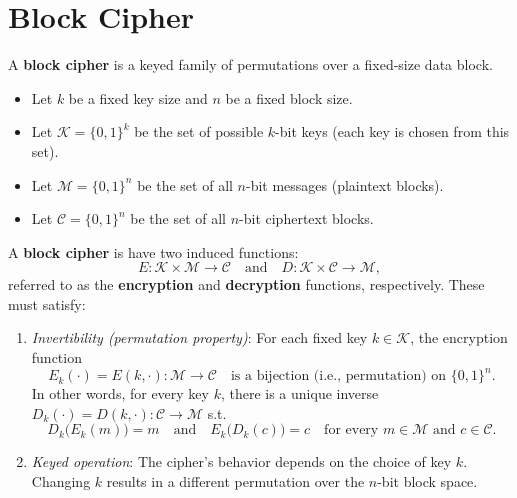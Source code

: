 \documentclass[11pt,a4paper]{report}
\theoremstyle{definitionstyle}
\begin{document}
\section{Block Cipher}
A \textbf{block cipher} is a keyed family of permutations over a fixed-size data block. \begin{itemize}
	\item Let \(k\) be a fixed key size and \(n\) be a fixed block size.
	\item Let \(\mathcal{K} = \{0,1\}^k\) be the set of possible $k$-bit keys (each key is chosen from this set).
	\item Let \(\mathcal{M} = \{0,1\}^n\) be the set of all \(n\)-bit messages (plaintext blocks).
	\item Let \(\mathcal{C} = \{0,1\}^n\) be the set of all \(n\)-bit ciphertext blocks.
\end{itemize}
A \textbf{block cipher} is have two induced functions: \[
E : \mathcal{K} \times \mathcal{M} \to \mathcal{C} 
\quad\text{and}\quad
D : \mathcal{K} \times \mathcal{C} \to \mathcal{M},
\] referred to as the \textbf{encryption} and \textbf{decryption} functions, respectively. These must satisfy:
\begin{enumerate}
	\item \emph{Invertibility (permutation property)}: For each fixed key \(k \in \mathcal{K}\), the encryption function \[
	E_k(\cdot) = E(k, \cdot): \mathcal{M} \to \mathcal{C}\quad\text{is a bijection (i.e., permutation) on $\{0,1\}^n$.}
	\] In other words, for every key \(k\), there is a unique inverse $D_k(\cdot) = D(k, \cdot): \mathcal{C} \to \mathcal{M}$
	s.t. \[
	D_k\bigl(E_k(m)\bigr) = m \quad \text{and} \quad E_k\bigl(D_k(c)\bigr) = c\quad\text{for every $m \in \mathcal{M}$ and $c \in \mathcal{C}$.}
	\]
	\item \emph{Keyed operation}: The cipher’s behavior depends on the choice of key \(k\). Changing \(k\) results in a different permutation over the \(n\)-bit block space.
\end{enumerate}
\end{document}
